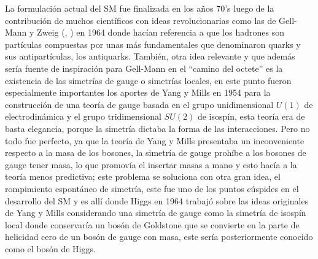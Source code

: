 La formulación actual del SM fue finalizada en los años 70’s luego de la contribución de muchos científicos con ideas revolucionarias como las de Gell-Mann y Zweig (\cite{GellMann:1964nj}, \cite{Zweig:1981pd}) en 1964 donde hacían referencia a que los hadrones son partículas compuestas por unas más fundamentales que denominaron quarks y sus antipartículas, los antiquarks. También, otra idea relevante y que además sería fuente de inspiración para Gell-Mann en el “camino del octete” es la existencia de las simetrías de gauge o simetrías locales, en este punto fueron especialmente importantes los aportes de Yang y Mills en 1954 \cite{PhysRev.96.191} para la construcción de una teoría de gauge basada en el grupo unidimensional \(U(1)\) de electrodinámica y el grupo tridimensional \(SU(2)\) de isospín, esta teoría era de basta elegancia, porque la simetría dictaba la forma de las interacciones. Pero no todo fue perfecto, ya que la teoría de Yang y Mills presentaba un inconveniente respecto a la masa de los bosones, la simetría de gauge prohíbe a los bosones de gauge tener masa, lo que promovía el insertar masas a mano y esto hacía a la teoría menos predictiva; este problema se soluciona con otra gran idea, el rompimiento espontáneo de simetría, este fue uno de los puntos cúspides en el desarrollo del SM y es allí donde Higgs en 1964 trabajó sobre las ideas originales de Yang y Mills considerando una simetría de gauge como la simetría de isospín local donde conservaría un bosón de Goldstone que se convierte en la parte de helicidad cero de un bosón de gauge con masa, este sería posteriormente conocido como el bosón de Higgs. 

